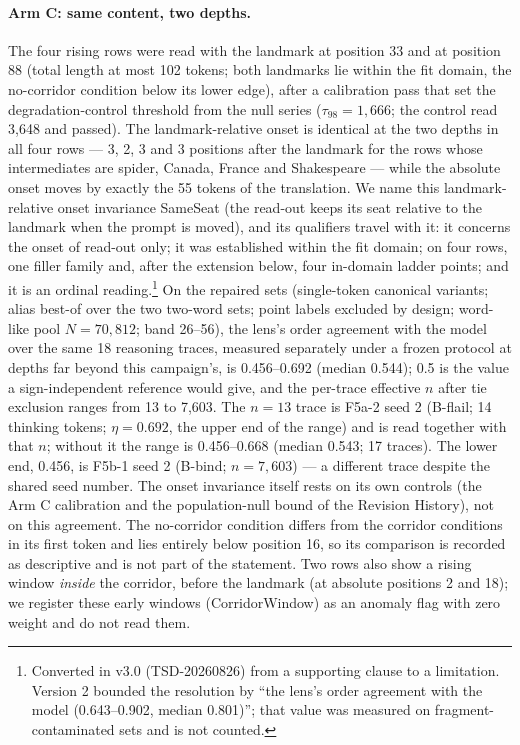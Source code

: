 \documentclass[11pt]{article}
\begin{document}
\paragraph{Arm C: same content, two depths.} The four rising rows were read with the landmark at position 33 and at position 88 (total length at most 102 tokens; both landmarks lie within the fit domain, the no-corridor condition below its lower edge), after a calibration pass that set the degradation-control threshold from the null series ($\tau_{98} = 1{,}666$; the control read 3{,}648 and passed). The landmark-relative onset is identical at the two depths in all four rows --- 3, 2, 3 and 3 positions after the landmark for the rows whose intermediates are spider, Canada, France and Shakespeare --- while the absolute onset moves by exactly the 55 tokens of the translation. We name this landmark-relative onset invariance SameSeat (the read-out keeps its seat relative to the landmark when the prompt is moved), and its qualifiers travel with it: it concerns the onset of read-out only; it was established within the fit domain; on four rows, one filler family and, after the extension below, four in-domain ladder points; and it is an ordinal reading.\footnote{Converted in v3.0 (TSD-20260826) from a supporting clause to a limitation. Version 2 bounded the resolution by ``the lens's order agreement with the model (0.643--0.902, median 0.801)''; that value was measured on fragment-contaminated sets and is not counted.} On the repaired sets (single-token canonical variants; alias best-of over the two two-word sets; point labels excluded by design; word-like pool $N = 70{,}812$; band 26--56), the lens's order agreement with the model over the same 18 reasoning traces, measured separately under a frozen protocol at depths far beyond this campaign's, is 0.456--0.692 (median 0.544); 0.5 is the value a sign-independent reference would give, and the per-trace effective $n$ after tie exclusion ranges from 13 to 7{,}603. The $n = 13$ trace is F5a-2 seed 2 (B-flail; 14 thinking tokens; $\eta = 0.692$, the upper end of the range) and is read together with that $n$; without it the range is 0.456--0.668 (median 0.543; 17 traces). The lower end, 0.456, is F5b-1 seed 2 (B-bind; $n = 7{,}603$) --- a different trace despite the shared seed number. The onset invariance itself rests on its own controls (the Arm C calibration and the population-null bound of the Revision History), not on this agreement. The no-corridor condition differs from the corridor conditions in its first token and lies entirely below position 16, so its comparison is recorded as descriptive and is not part of the statement. Two rows also show a rising window \emph{inside} the corridor, before the landmark (at absolute positions 2 and 18); we register these early windows (CorridorWindow) as an anomaly flag with zero weight and do not read them.
\end{document}
